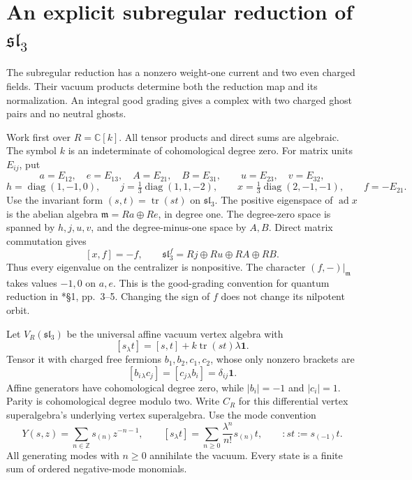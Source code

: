 \section{An explicit subregular reduction of \texorpdfstring{$\mathfrak{sl}_3$}{sl3}}
\label{sec:cbc27-subregular}

The subregular reduction has a nonzero weight-one current and two even charged fields.
Their vacuum products determine both the reduction map and its normalization.
An integral good grading gives a complex with two charged ghost pairs and no neutral ghosts.

Work first over $R=\mathbb C[k]$.
All tensor products and direct sums are algebraic.
The symbol $k$ is an indeterminate of cohomological degree zero.
For matrix units $E_{ij}$, put
\[
 a=E_{12},\quad e=E_{13},\quad A=E_{21},\quad B=E_{31},
 \qquad u=E_{23},\quad v=E_{32},
\]
\[
 h=\operatorname{diag}(1,-1,0),\qquad
 j=\tfrac13\operatorname{diag}(1,1,-2),\qquad
 x=\tfrac13\operatorname{diag}(2,-1,-1),\qquad f=-E_{21}.
\]
Use the invariant form $(s,t)=\operatorname{tr}(st)$ on $\mathfrak{sl}_3$.
The positive eigenspace of $\operatorname{ad}x$ is the abelian algebra
$\mathfrak m=Ra\oplus Re$, in degree one.
The degree-zero space is spanned by $h,j,u,v$, and the degree-minus-one space by $A,B$.
Direct matrix commutation gives
\[
 [x,f]=-f,\qquad
 \mathfrak{sl}_3^f=Rj\oplus Ru\oplus RA\oplus RB.
\]
Thus every eigenvalue on the centralizer is nonpositive.
The character $(f,-)|_{\mathfrak m}$ takes values $-1,0$ on $a,e$.
This is the good-grading convention for quantum reduction in
\cite{SubregularKW027}*{\S1, pp.~3--5}.
Changing the sign of $f$ does not change its nilpotent orbit.

Let $V_R(\mathfrak{sl}_3)$ be the universal affine vacuum vertex algebra with
\[
 [s_\lambda t]=[s,t]+k\operatorname{tr}(st)\lambda\mathbf1.
\]
Tensor it with charged free fermions $b_1,b_2,c_1,c_2$, whose only nonzero brackets are
\[
 [b_i{}_{\lambda}c_j]=[c_j{}_{\lambda}b_i]=\delta_{ij}\mathbf1.
\]
Affine generators have cohomological degree zero, while $|b_i|=-1$ and $|c_i|=1$.
Parity is cohomological degree modulo two.
Write $C_R$ for this differential vertex superalgebra's underlying vertex superalgebra.
Use the mode convention
\[
 Y(s,z)=\sum_{n\in\mathbb Z}s_{(n)}z^{-n-1},\qquad
 [s_\lambda t]=\sum_{n\geq0}\frac{\lambda^n}{n!}s_{(n)}t,
 \qquad :st:=s_{(-1)}t.
\]
All generating modes with $n\geq0$ annihilate the vacuum.
Every state is a finite sum of ordered negative-mode monomials.


